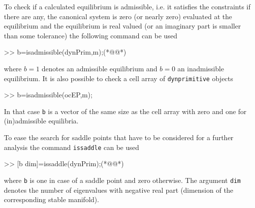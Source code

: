 To check if a calculated equilibrium is admissible, i.e. it satisfies the constraints if there are any, the canonical system is zero (or nearly zero) evaluated at the equilibrium and the equilibrium is real valued (or an imaginary part is smaller than some tolerance) the following command can be used
\begin{matlab} 
>> b=isadmissible(dynPrim,m);(*@@*)
\end{matlab}
where $b=1$ denotes an admissible equilibrium and $b=0$ an inadmissible equilibrium. It is also possible to check a cell array of \lstinline+dynprimitive+ objects
\begin{matlab} 
>> b=isadmissible(ocEP,m);
\end{matlab}
In that case \lstinline+b+ is a vector of the same size as the cell array with zero and one for (in)admissible equilibria.

To ease the search for saddle points that have to be considered for a further analysis the command \lstinline+issaddle+ can be used
\begin{matlab} 
>> [b dim]=issaddle(dynPrim);(*@@*)
\end{matlab}
where \lstinline+b+ is one in case of a saddle point and zero otherwise. The argument \lstinline+dim+ denotes the number of eigenvalues with negative real part (dimension of the corresponding stable manifold).

